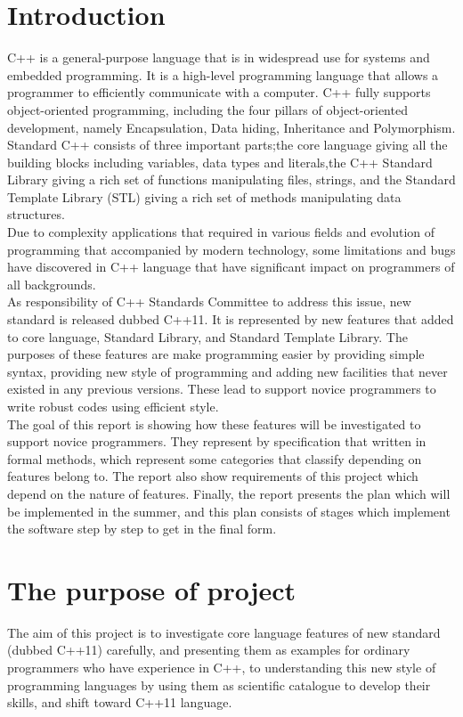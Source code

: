 \documentclass[12pt]{report}
\begin{document}
\section{Introduction}  
\label{section: intorduction}
C++ is a general-purpose language that is in widespread use for systems and embedded programming. It is a high-level programming language that allows a programmer to efficiently communicate with a computer. C++ fully supports object-oriented programming, including the four pillars of object-oriented development, namely Encapsulation, Data hiding, Inheritance and Polymorphism.\\
Standard C++ consists of three important parts;the core language giving all the building blocks including variables, data types and literals,the C++ Standard Library giving a rich set of functions manipulating files, strings, and the Standard Template Library (STL) giving a rich set of methods manipulating data structures.\\
Due to complexity applications  that required in various fields and evolution of programming that  accompanied by modern technology, some limitations and bugs have discovered in C++ language that have significant impact on programmers of all backgrounds.\\
As responsibility of C++ Standards Committee to address this issue, new standard is released dubbed C++11. It is represented by new features that added to core language, Standard  Library, and Standard Template Library. The purposes of these features are make programming easier by providing simple syntax, providing new style of programming and adding new facilities that never existed in any previous versions. These lead to support novice programmers to write robust codes using efficient style.\\
The goal of this report is showing how these features will be investigated to support novice programmers. They represent by specification that written in formal methods, which represent some categories that  classify depending on features belong to. The report also show requirements of this project which depend on the nature of features. Finally, the report presents the plan which will be implemented in the summer, and this plan consists of stages which implement the software step by step to get in the final form.


\section{The purpose of project}
\label{section:The purpose of project}
The aim of this project is to investigate core language  features of new standard (dubbed C++11) carefully, and presenting them as examples for ordinary programmers who have experience in C++, to understanding this new style of programming languages by using them as scientific  catalogue to develop their skills, and shift toward C++11 language.
\end{document}
